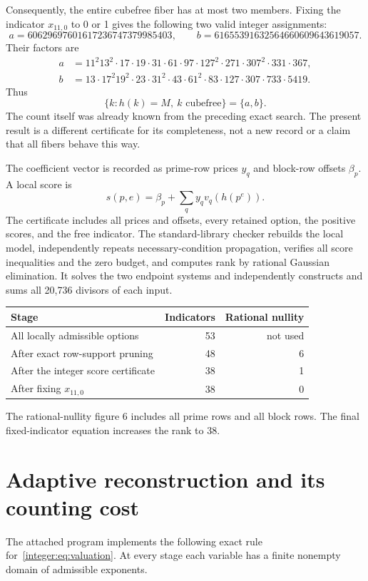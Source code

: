 Consequently, the entire cubefree fiber has at most two members. Fixing the indicator $x_{11,0}$ to 0 or 1 gives the following two valid integer assignments:
\[
 a=60629697601617236747379985403,\qquad
 b=61655391632564660609643619057.
\]
Their factors are
\begin{align*}
 a&=11^2 13^2\cdot17\cdot19\cdot31\cdot61\cdot97\cdot127^2\cdot271\cdot307^2\cdot331\cdot367,\\
 b&=13\cdot17^2 19^2\cdot23\cdot31^2\cdot43\cdot61^2\cdot83\cdot127\cdot307\cdot733\cdot5419.
\end{align*}
Thus
\[
 \boxed{\{k:h(k)=M,\ k\text{ cubefree}\}=\{a,b\}.}
\]
The count itself was already known from the preceding exact search. The present result is a different certificate for its completeness, not a new record or a claim that all fibers behave this way.

The coefficient vector is recorded as prime-row prices $y_q$ and block-row offsets $\beta_p$. A local score is
\[
 s(p,e)=\beta_p+\sum_q y_qv_q(h(p^e)).
\]
The certificate includes all prices and offsets, every retained option, the positive scores, and the free indicator. The standard-library checker rebuilds the local model, independently repeats necessary-condition propagation, verifies all score inequalities and the zero budget, and computes rank by rational Gaussian elimination. It solves the two endpoint systems and independently constructs and sums all 20,736 divisors of each input.

\begin{center}
\begin{tabular}{@{}lrr@{}}
\toprule
Stage & Indicators & Rational nullity\\
\midrule
All locally admissible options & 53 & not used\\
After exact row-support pruning & 48 & 6\\
After the integer score certificate & 38 & 1\\
After fixing $x_{11,0}$ & 38 & 0\\
\bottomrule
\end{tabular}
\end{center}
The rational-nullity figure 6 includes all prime rows and all block rows. The final fixed-indicator equation increases the rank to 38.


\section{Adaptive reconstruction and its counting cost}
The attached program implements the following exact rule for~\eqref{integer:eq:valuation}. At every stage each variable has a finite nonempty domain of admissible exponents.

